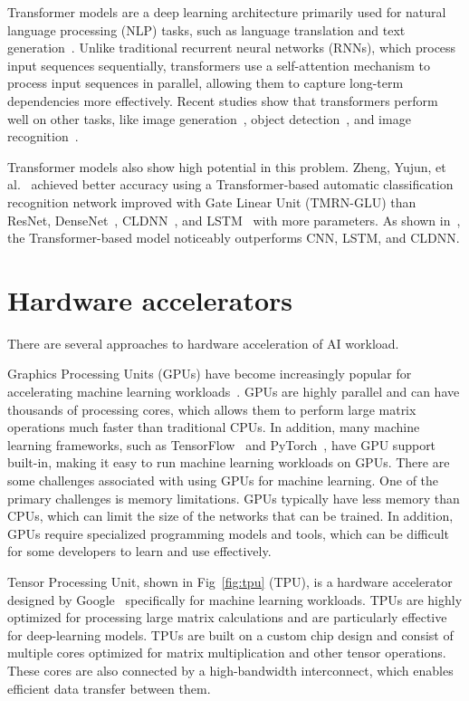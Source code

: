 Transformer models are a deep learning architecture primarily used for natural language processing (NLP) tasks, such as language translation and text generation~\cite{transformer_nlp_applications}. Unlike traditional recurrent neural networks (RNNs), which process input sequences sequentially, transformers use a self-attention mechanism to process input sequences in parallel, allowing them to capture long-term dependencies more effectively. Recent studies show that transformers perform well on other tasks, like image generation~\cite{image_transformer}, object detection~\cite{object_detection_transformer}, and image recognition~\cite{image_recognition_transformer}. 

Transformer models also show high potential in this problem. Zheng, Yujun, et al.~\cite{glu_transormer} achieved better accuracy using a Transformer-based automatic classification recognition network improved with Gate Linear Unit (TMRN-GLU) than ResNet, DenseNet~\cite{densenet}, CLDNN~\cite{cldnn}, and LSTM~\cite{lstm} with more parameters. As shown in~\cite{transformer_amr}, the Transformer-based model noticeably outperforms CNN, LSTM, and CLDNN. 

\section{Hardware accelerators}

There are several approaches to hardware acceleration of AI workload.

Graphics Processing Units (GPUs) have become increasingly popular for accelerating machine learning workloads~\cite{gpgpu_for_dl}. GPUs are highly parallel and can have thousands of processing cores, which allows them to perform large matrix operations much faster than traditional CPUs. In addition, many machine learning frameworks, such as TensorFlow~\cite{tensorflow2015-whitepaper} and PyTorch~\cite{pytorch}, have GPU support built-in, making it easy to run machine learning workloads on GPUs. There are some challenges associated with using GPUs for machine learning. One of the primary challenges is memory limitations. GPUs typically have less memory than CPUs, which can limit the size of the networks that can be trained. In addition, GPUs require specialized programming models and tools, which can be difficult for some developers to learn and use effectively.

Tensor Processing Unit, shown in Fig~\ref{fig:tpu} (TPU), is a hardware accelerator designed by Google~\cite{tpu} specifically for machine learning workloads. TPUs are highly optimized for processing large matrix calculations and are particularly effective for deep-learning models. TPUs are built on a custom chip design and consist of multiple cores optimized for matrix multiplication and other tensor operations. These cores are also connected by a high-bandwidth interconnect, which enables efficient data transfer between them.

